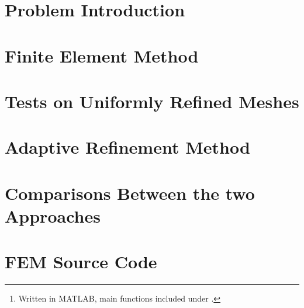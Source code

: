 \documentclass[12pt]{article}
\title{\reporttitle}
\author{Andrea Di Antonio, 858798 \\ \hyperlink{mailto:a.diantonio1@campus.unimib.it}{a.diantonio1@campus.unimib.it}}
\date{Exam session of July 27, 2023 \\ Academic Year 2022-23}
\newcommand{\reporttitle}{Adaptive 1D 1st-order Lagrange FEM}
\begin{document}
	\maketitle
	\thispagestyle{fancy}

	\begin{abstract}
		\begin{center}
			Report for the course \textit{Metodi Numerici per Equazioni alle Derivate Parziali} on the definition and costruction of an \textit{\reporttitle}\footnote{Written in MATLAB, main functions included under .}, an approach which consists in considering a sequence of adaptively refined meshes to solve a FEM problem, and its subsequent analysis which includes a comparison against a more naive approach by a sequence of uniformly refined meshes.
		\end{center}
	\end{abstract}

	\newpage
	\tableofcontents

	\newpage
	\section{Problem Introduction}
	

	\newpage
	\section{Finite Element Method}
	

	\newpage
	\section{Tests on Uniformly Refined Meshes}
	

	\newpage
	\section{Adaptive Refinement Method}
	

	\newpage
	\section{Comparisons Between the two Approaches}
	

	\newpage
	\section{FEM Source Code} \label{source}
	
\end{document}
